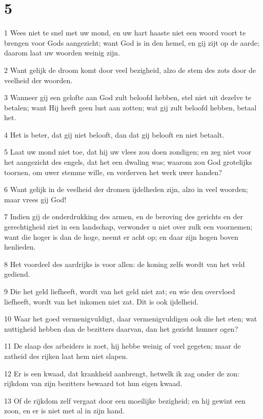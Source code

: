 \chapter{5}

\par 1 Wees niet te snel met uw mond, en uw hart haaste niet een woord voort te brengen voor Gods aangezicht; want God is in den hemel, en gij zijt op de aarde; daarom laat uw woorden weinig zijn.
\par 2 Want gelijk de droom komt door veel bezigheid, alzo de stem des zots door de veelheid der woorden.
\par 3 Wanneer gij een gelofte aan God zult beloofd hebben, stel niet uit dezelve te betalen; want Hij heeft geen lust aan zotten; wat gij zult beloofd hebben, betaal het.
\par 4 Het is beter, dat gij niet belooft, dan dat gij belooft en niet betaalt.
\par 5 Laat uw mond niet toe, dat hij uw vlees zou doen zondigen; en zeg niet voor het aangezicht des engels, dat het een dwaling was; waarom zou God grotelijks toornen, om uwer stemme wille, en verderven het werk uwer handen?
\par 6 Want gelijk in de veelheid der dromen ijdelheden zijn, alzo in veel woorden; maar vrees gij God!
\par 7 Indien gij de onderdrukking des armen, en de beroving des gerichts en der gerechtigheid ziet in een landschap, verwonder u niet over zulk een voornemen; want die hoger is dan de hoge, neemt er acht op; en daar zijn hogen boven henlieden.
\par 8 Het voordeel des aardrijks is voor allen: de koning zelfs wordt van het veld gediend.
\par 9 Die het geld liefheeft, wordt van het geld niet zat; en wie den overvloed liefheeft, wordt van het inkomen niet zat. Dit is ook ijdelheid.
\par 10 Waar het goed vermenigvuldigt, daar vermenigvuldigen ook die het eten; wat nuttigheid hebben dan de bezitters daarvan, dan het gezicht hunner ogen?
\par 11 De slaap des arbeiders is zoet, hij hebbe weinig of veel gegeten; maar de zatheid des rijken laat hem niet slapen.
\par 12 Er is een kwaad, dat krankheid aanbrengt, hetwelk ik zag onder de zon: rijkdom van zijn bezitters bewaard tot hun eigen kwaad.
\par 13 Of de rijkdom zelf vergaat door een moeilijke bezigheid; en hij gewint een zoon, en er is niet met al in zijn hand.
